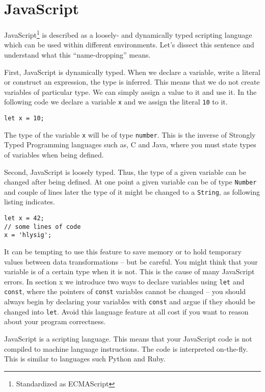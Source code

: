 \section{JavaScript}\label{sec:javascript}
JavaScript\footnote{Standardized as ECMAScript} is described as a loosely- and dynamically typed scripting language which can be used within different environments. Let's dissect this sentence and understand what this ``name-dropping'' means.

First, JavaScript is dynamically typed. When we declare a variable, write a literal or construct an expression, the type is inferred. This means that we do not create variables of particular type. We can simply assign a value to it and use it. In the following code we declare a variable \texttt{x} and we assign the literal \texttt{10} to it.

\begin{lstlisting}
let x = 10;
\end{lstlisting}

The type of the variable \texttt{x} will be of type \texttt{number}. This is the inverse of Strongly Typed Programming languages such as, C and Java, where you must state types of variables when being defined.

Second, JavaScript is loosely typed. Thus, the type of a given variable can be changed after being defined. At one point a given variable can be of type \texttt{Number} and couple of lines later the type of it might be changed to a \texttt{String}, as following listing indicates.

\begin{lstlisting}
let x = 42;
// some lines of code
x = 'hlysig';
\end{lstlisting}

It can be tempting to use this feature to save memory or to hold temporary values between data transformations -- but be careful. You might think that your variable is of a certain type when it is not. This is the cause of many JavaScript errors. In section x we introduce two ways to declare variables using \texttt{let} and \texttt{const}, where the pointers of \texttt{const} variables cannot be changed -- you should always begin by declaring your variables with \texttt{const} and argue if they should be changed into \texttt{let}. Avoid this language feature at all cost if you want to reason about your program correctness.

JavaScript is a scripting language. This means that your JavaScript code is not compiled to machine language instructions. The code is interpreted on-the-fly. This is similar to languages such Python and Ruby. 

